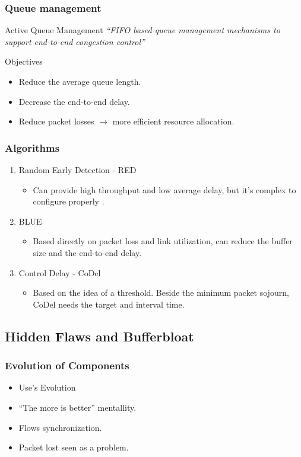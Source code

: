 \begin{frame}
	\frametitle{Queue management}
	\begin{block}{Active Queue Management}
		\centering
		\textit{``FIFO based queue management mechanisms to support end-to-end congestion control''}
	\end{block}

	\begin{block}{Objectives}
		\begin{itemize}
			\item Reduce the average queue length. 
			\item Decrease the end-to-end delay.
			\item Reduce packet losses $\rightarrow$ more efficient resource allocation.
		\end{itemize}
	\end{block}
\end{frame}

\begin{frame}
	\frametitle{Algorithms}
	\begin{block}{}
		\begin{enumerate}
			\item Random Early Detection - RED
			\begin{itemize}
				\item Can provide high throughput and low average delay, but it's complex to configure properly .
			\end{itemize}
			\item BLUE
			\begin{itemize}
				\item Based directly on packet loss and link utilization, can reduce the buffer size and the end-to-end delay.
			\end{itemize}
			\item Control Delay - CoDel
			\begin{itemize}
				\item Based on the idea of a threshold. Beside the minimum packet sojourn, CoDel needs the target and interval time.
			\end{itemize}
		\end{enumerate}
	\end{block}
\end{frame}

\subsection{Hidden Flaws and Bufferbloat}
\begin{frame}
	\frametitle{Evolution of Components}
	\begin{itemize}
		\item Use's Evolution
		\item ``The more is better'' mentallity.
		\item Flows synchronization.
		\item Packet lost seen as a problem.
	\end{itemize}
\end{frame}

